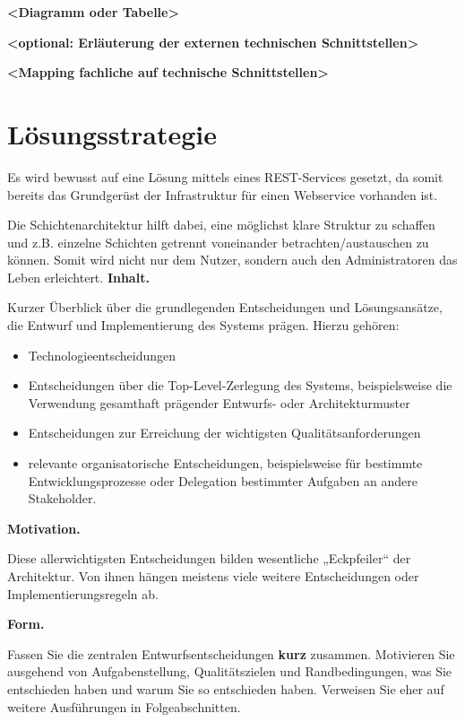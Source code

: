 \documentclass[]{article}
\begin{document}
\textbf{\textless{}Diagramm oder Tabelle\textgreater{}}

\textbf{\textless{}optional: Erläuterung der externen technischen
Schnittstellen\textgreater{}}

\textbf{\textless{}Mapping fachliche auf technische
Schnittstellen\textgreater{}}

\section{Lösungsstrategie}\label{section-solution-strategy}
Es wird bewusst auf eine Lösung mittels eines REST-Services gesetzt, da somit bereits das Grundgerüst der Infrastruktur für einen Webservice vorhanden ist.

Die Schichtenarchitektur hilft dabei, eine möglichst klare Struktur zu schaffen und z.B. einzelne Schichten getrennt voneinander betrachten/austauschen zu können. Somit wird nicht nur dem Nutzer, sondern auch den Administratoren das Leben erleichtert.
\textbf{Inhalt.}

Kurzer Überblick über die grundlegenden Entscheidungen und
Lösungsansätze, die Entwurf und Implementierung des Systems prägen.
Hierzu gehören:

\begin{itemize}
\item
  Technologieentscheidungen
\item
  Entscheidungen über die Top-Level-Zerlegung des Systems,
  beispielsweise die Verwendung gesamthaft prägender Entwurfs- oder
  Architekturmuster
\item
  Entscheidungen zur Erreichung der wichtigsten Qualitätsanforderungen
\item
  relevante organisatorische Entscheidungen, beispielsweise für
  bestimmte Entwicklungsprozesse oder Delegation bestimmter Aufgaben an
  andere Stakeholder.
\end{itemize}

\textbf{Motivation.}

Diese allerwichtigsten Entscheidungen bilden wesentliche „Eckpfeiler``
der Architektur. Von ihnen hängen meistens viele weitere Entscheidungen
oder Implementierungsregeln ab.

\textbf{Form.}

Fassen Sie die zentralen Entwurfsentscheidungen \textbf{kurz} zusammen.
Motivieren Sie ausgehend von Aufgabenstellung, Qualitätszielen und
Randbedingungen, was Sie entschieden haben und warum Sie so entschieden
haben. Verweisen Sie eher auf weitere Ausführungen in Folgeabschnitten.
\end{document}
